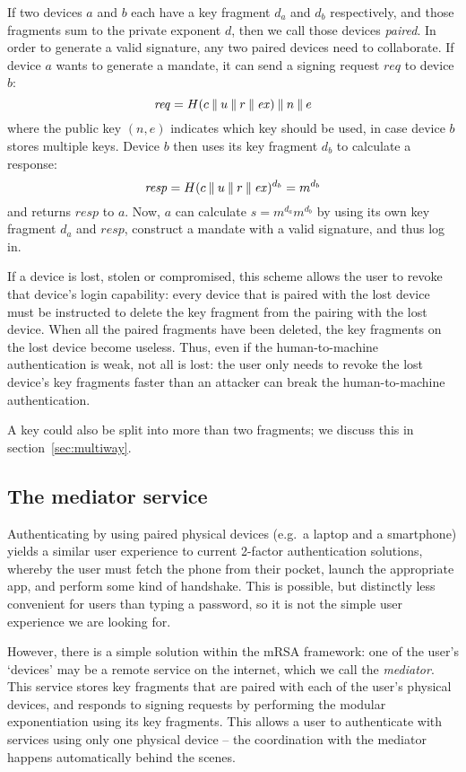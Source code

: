 If two devices $a$ and $b$ each have a key fragment $d_a$ and $d_b$ respectively, and those
fragments sum to the private exponent $d$, then we call those devices \emph{paired}. In order to
generate a valid signature, any two paired devices need to collaborate. If device $a$ wants to
generate a mandate, it can send a signing request $\mathit{req}$ to device $b$:
$$\mathit{req} = H(c \mathbin{\|} u \mathbin{\|} r \mathbin{\|} \mathit{ex}) \mathbin{\|} n \mathbin{\|} e$$
where the public key $(n, e)$ indicates which key should be used, in case device $b$ stores multiple
keys. Device $b$ then uses its key fragment $d_b$ to calculate a response:
$$\mathit{resp} = H(c \mathbin{\|} u \mathbin{\|} r \mathbin{\|} \mathit{ex})^{d_b} = m^{d_b}$$
and returns $\mathit{resp}$ to $a$. Now, $a$ can calculate $s = m^{d_a} m^{d_b}$ by using its own
key fragment $d_a$ and $\mathit{resp}$, construct a mandate with a valid signature, and thus log in.

If a device is lost, stolen or compromised, this scheme allows the user to revoke that device's
login capability: every device that is paired with the lost device must be instructed to delete the
key fragment from the pairing with the lost device. When all the paired fragments have been deleted,
the key fragments on the lost device become useless. Thus, even if the human-to-machine
authentication is weak, not all is lost: the user only needs to revoke the lost device's key
fragments faster than an attacker can break the human-to-machine authentication.

A key could also be split into more than two fragments; we discuss this in section~\ref{sec:multiway}.

\subsection{The mediator service}\label{sec:mediator}

Authenticating by using paired physical devices (e.g.\ a laptop and a smartphone) yields a similar
user experience to current 2-factor authentication solutions, whereby the user must fetch the phone
from their pocket, launch the appropriate app, and perform some kind of handshake. This is
possible, but distinctly less convenient for users than typing a password, so it is not the simple
user experience we are looking for.

However, there is a simple solution within the mRSA framework: one of the user's `devices' may be a
remote service on the internet, which we call the \emph{mediator}. This service stores key fragments
that are paired with each of the user's physical devices, and responds to signing requests by
performing the modular exponentiation using its key fragments. This allows a user to authenticate
with services using only one physical device -- the coordination with the mediator happens
automatically behind the scenes.

